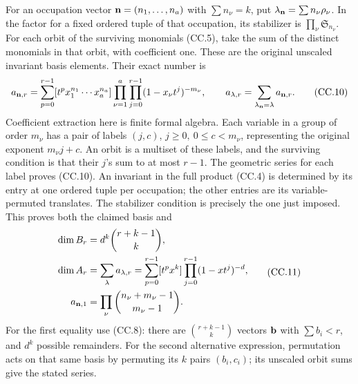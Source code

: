 For an occupation vector \({\bf n}=(n_1,\ldots,n_a)\) with
\(\sum n_\nu=k\), put \(\lambda_{\bf n}=\sum n_\nu\rho_\nu\).
In the factor for a fixed ordered tuple of that occupation, its
stabilizer is \(\prod_\nu\mathfrak S_{n_\nu}\).
For each orbit of the surviving monomials (CC.5), take the sum of
the distinct monomials in that orbit, with coefficient one.
These are the original unscaled invariant basis elements.
Their exact number is
\[
 a_{{\bf n},r}
 =\sum_{p=0}^{r-1}
 [t^p x_1^{n_1}\cdots x_a^{n_a}]
 \prod_{\nu=1}^a\prod_{j=0}^{r-1}
 (1-x_\nu t^j)^{-m_\nu},
 \qquad
 a_{\lambda,r}=\sum_{\lambda_{\bf n}=\lambda}a_{{\bf n},r}.
 \tag{CC.10}
\]
Coefficient extraction here is finite formal algebra.  Each variable
in a group of order \(m_\nu\) has a pair of labels
\((j,c)\), \(j\geq0,\ 0\leq c<m_\nu\), representing the original
exponent \(m_\nu j+c\).  An orbit is a multiset of these labels,
and the surviving condition is that their \(j\)'s sum to at most
\(r-1\).  The geometric series for each label proves (CC.10).
An invariant in the full product (CC.4) is determined by its entry
at one ordered tuple per occupation; the other entries are its
variable-permuted translates.  The stabilizer condition is precisely
the one just imposed.  This proves both the claimed basis and
\[
\begin{split}
 \dim B_r&=d^k\binom{r+k-1}{k},\\
 \dim A_r&=\sum_\lambda a_{\lambda,r}
 =\sum_{p=0}^{r-1}[t^p x^k]
       \prod_{j=0}^{r-1}(1-xt^j)^{-d},\\
 a_{{\bf n},1}&=\prod_\nu\binom{n_\nu+m_\nu-1}{m_\nu-1}.
\end{split}
\tag{CC.11}
\]
For the first equality use (CC.8): there are
\(\binom{r+k-1}{k}\) vectors \({\bf b}\) with \(\sum b_i<r\),
and \(d^k\) possible remainders.  For the second alternative expression,
permutation acts on that same basis by permuting its \(k\) pairs
\((b_i,c_i)\); its unscaled orbit sums give the stated series.

